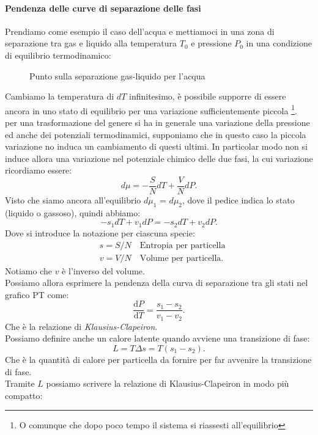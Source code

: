 \paragraph{Pendenza delle curve di separazione delle fasi}%
Prendiamo come esempio il caso dell'acqua e mettiamoci in una zona di separazione tra gas e liquido alla temperatura $T_0$ e pressione $P_0$ in una condizione di equilibrio termodinamico:\\
\begin{figure}[H]
    \centering
    \caption{Punto sulla separazione gas-liquido per l'acqua}
    \label{fig:punto-sulla-separazione-gas-liquido-per-l'acqua}
\end{figure}
\noindent
Cambiamo la temperatura di $dT$ infinitesimo, è possibile supporre di essere ancora in uno stato di equilibrio per una variazione sufficientemente piccola \footnote{O comunque che dopo poco tempo il sistema si riassesti all'equilibrio}.\\
per una trasformazione del genere si ha in generale una variazione della pressione ed anche dei potenziali termodinamici, supponiamo che in questo caso la piccola variazione no induca un cambiamento di questi ultimi. In particolar modo non si induce allora una variazione nel potenziale chimico delle due fasi, la cui variazione ricordiamo essere:
 \[
	d\mu=-\frac{S}{N}dT + \frac{V}{N}dP
.\] 
Visto che siamo ancora all'equilibrio $d\mu_1$ = $d\mu_2$, dove il pedice indica lo stato (liquido o gassoso), quindi abbiamo:
\[
	-s_1 dT + v_1 dP = -s_2 dT + v_2 dP
.\] 
Dove si introduce la notazione per ciascuna specie:
\begin{align}
	&s = S/N \quad \text{Entropia per particella}\\
	&v = V/N \quad \text{Volume per particella}
.\end{align}
Notiamo che $v$ è l'inverso del volume.\\
Possiamo allora esprimere la pendenza della curva di separazione tra gli stati nel grafico PT come:
\[
	\frac{\mbox{d} P}{\mbox{d} T} = \frac{s_1-s_2}{v_1-v_2}
.\] 
Che è la relazione di \textit{Klausius-Clapeiron}.\\
Possiamo definire anche un calore latente quando avviene una transizione di fase: \[
	L = T \Delta s = T \left( s_1-s_2 \right) 
.\]
Che è la quantità di calore per particella da fornire per far avvenire la transizione di fase.\\
Tramite $L$ possiamo scrivere la relazione di Klausius-Clapeiron in modo più compatto:
